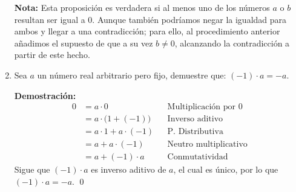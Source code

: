 \documentclass[11pt]{article}
\begin{document}
\begin{enumerate}[label=\alph*)]
        \textbf{Nota:} Esta proposición es verdadera si al menos uno de los números $a$ o $b$ resultan ser igual a $0$. Aunque también podríamos negar la igualdad para ambos y llegar a una contradicción; para ello, al procedimiento anterior añadimos el supuesto de que a su vez $b\neq0$, alcanzando la contradicción a partir de este hecho.

        \item Sea $a$ un número real arbitrario pero fijo, demuestre que: $(-1) \cdot a =-a $.
        
        \textbf{Demostración:} \begin{align*}
            0 &= a \cdot 0 && \text{Multiplicación por $0$}\\
            &= a \cdot \bigl(1+(-1)\bigr) && \text{Inverso aditivo}\\
            &= a \cdot 1 + a \cdot (-1)  && \text{P. Distributiva}\\
            &= a + a \cdot (-1)  && \text{Neutro multiplicativo}\\
            &= a + (-1) \cdot a  && \text{Conmutatividad}
        \end{align*} Sigue que $(-1) \cdot a$ es inverso aditivo de $a$, el cual es único, por lo que $(-1) \cdot a = -a$. \qed


\end{enumerate}
\end{document}
